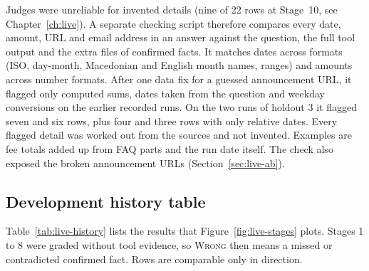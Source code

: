 Judges were unreliable for invented details (nine of 22 rows at Stage~10, see Chapter~\ref{ch:live}). A separate checking script therefore compares every date, amount, URL and email address in an answer against the question, the full tool output and the extra files of confirmed facts. It matches dates across formats (ISO, day-month, Macedonian and English month names, ranges) and amounts across number formats. After one data fix for a guessed announcement URL, it flagged only computed sums, dates taken from the question and weekday conversions on the earlier recorded runs. On the two runs of holdout 3 it flagged seven and six rows, plus four and three rows with only relative dates. Every flagged detail was worked out from the sources and not invented. Examples are fee totals added up from FAQ parts and the run date itself. The check also exposed the broken announcement URLs (Section~\ref{sec:live-ab}).

\subsection{Development history table}
\label{app:live-history}

Table~\ref{tab:live-history} lists the results that Figure~\ref{fig:live-stages} plots. Stages 1 to 8 were graded without tool evidence, so \textsc{Wrong} then means a missed or contradicted confirmed fact. Rows are comparable only in direction.

